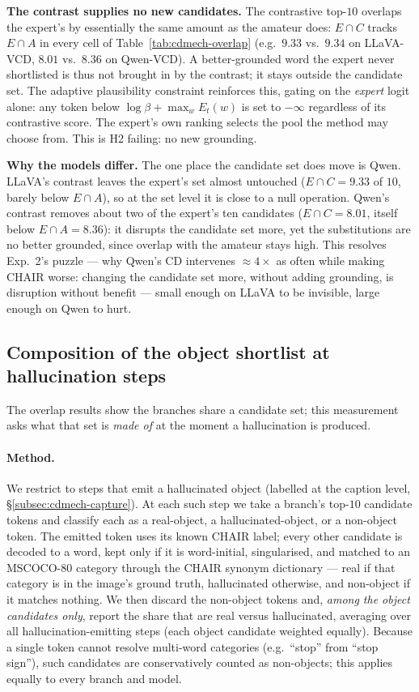 \documentclass{article}
\begin{document}
\textbf{The contrast supplies no new candidates.} The contrastive top-$10$
overlaps the expert's by essentially the same amount as the amateur does:
$E\!\cap\!C$ tracks $E\!\cap\!A$ in every cell of Table~\ref{tab:cdmech-overlap}
(e.g.\ $9.33$ vs.\ $9.34$ on LLaVA-VCD, $8.01$ vs.\ $8.36$ on Qwen-VCD). A
better-grounded word the expert never shortlisted is thus not brought in by the
contrast; it stays outside the candidate set. The adaptive plausibility
constraint reinforces this, gating on the \emph{expert} logit alone: any token
below $\log\beta + \max_w E_t(w)$ is set to $-\infty$ regardless of its
contrastive score. The expert's own ranking selects the pool the method may
choose from. This is H2 failing: no new grounding.

\textbf{Why the models differ.} The one place the candidate set does move is
Qwen. LLaVA's contrast leaves the expert's set almost untouched
($E\!\cap\!C = 9.33$ of $10$, barely below $E\!\cap\!A$), so at the set level it
is close to a null operation. Qwen's contrast removes about two of the expert's
ten candidates ($E\!\cap\!C = 8.01$, itself below $E\!\cap\!A = 8.36$): it
disrupts the candidate set more, yet the substitutions are no better grounded,
since overlap with the amateur stays high. This resolves Exp.~2's puzzle --- why
Qwen's CD intervenes ${\approx}4\times$ as often while making CHAIR worse:
changing the candidate set more, without adding grounding, is disruption without
benefit --- small enough on LLaVA to be invisible, large enough on Qwen to
hurt.

\subsection{Composition of the object shortlist at hallucination steps}
\label{subsec:cdmech-res-shortlist}

The overlap results show the branches share a candidate set; this measurement
asks what that set is \emph{made of} at the moment a hallucination is produced.

\paragraph{Method.} We restrict to steps that emit a hallucinated object (labelled
at the caption level, \S\ref{subsec:cdmech-capture}). At each such step we take a
branch's top-$10$ candidate tokens and classify each as a real-object, a
hallucinated-object, or a non-object token. The emitted token uses its known
CHAIR label; every other candidate is decoded to a word, kept only if it is
word-initial, singularised, and matched to an MSCOCO-80 category through the
CHAIR synonym dictionary --- real if that category is in the image's ground
truth, hallucinated otherwise, and non-object if it matches nothing. We then
discard the non-object tokens and, \emph{among the object candidates only},
report the share that are real versus hallucinated, averaging over all
hallucination-emitting steps (each object candidate weighted equally). Because a
single token cannot resolve multi-word categories (e.g.\ ``stop'' from ``stop
sign''), such candidates are conservatively counted as non-objects; this applies
equally to every branch and model.
\end{document}
